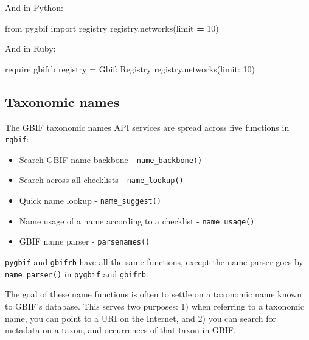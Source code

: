 \documentclass[3p]{elsarticle} %
\providecommand{\tightlist}{%
  \setlength{\itemsep}{0pt}\setlength{\parskip}{0pt}}
\newenvironment{Shaded}{\begin{snugshade}}{\end{snugshade}}
\newcommand{\DataTypeTok}[1]{\textcolor[rgb]{0.13,0.29,0.53}{#1}}
\newcommand{\DecValTok}[1]{\textcolor[rgb]{0.00,0.00,0.81}{#1}}
\newcommand{\ImportTok}[1]{#1}
\newcommand{\NormalTok}[1]{#1}
\newcommand{\OperatorTok}[1]{\textcolor[rgb]{0.81,0.36,0.00}{\textbf{#1}}}
\newcommand{\StringTok}[1]{\textcolor[rgb]{0.31,0.60,0.02}{#1}}
\begin{document}
And in Python:

\begin{Shaded}
\begin{Highlighting}[]
\ImportTok{from}\NormalTok{ pygbif }\ImportTok{import}\NormalTok{ registry}
\NormalTok{registry.networks(limit }\OperatorTok{=} \DecValTok{10}\NormalTok{)}
\end{Highlighting}
\end{Shaded}

And in Ruby:

\begin{Shaded}
\begin{Highlighting}[]
\NormalTok{require }\StringTok{\textquotesingle{}gbifrb\textquotesingle{}}
\NormalTok{registry = }\DataTypeTok{Gbif}\NormalTok{::}\DataTypeTok{Registry}
\NormalTok{registry.networks(}\StringTok{limit: }\DecValTok{10}\NormalTok{)}
\end{Highlighting}
\end{Shaded}

\hypertarget{taxonomic-names}{%
\subsection{Taxonomic names}\label{taxonomic-names}}

The GBIF taxonomic names API services are spread across five functions
in \texttt{rgbif}:

\begin{itemize}
\tightlist
\item
  Search GBIF name backbone - \texttt{name\_backbone()}
\item
  Search across all checklists - \texttt{name\_lookup()}
\item
  Quick name lookup - \texttt{name\_suggest()}
\item
  Name usage of a name according to a checklist - \texttt{name\_usage()}
\item
  GBIF name parser - \texttt{parsenames()}
\end{itemize}

\texttt{pygbif} and \texttt{gbifrb} have all the same functions, except
the name parser goes by \texttt{name\_parser()} in \texttt{pygbif} and
\texttt{gbifrb}.

The goal of these name functions is often to settle on a taxonomic name
known to GBIF's database. This serves two purposes: 1) when referring to
a taxonomic name, you can point to a URI on the Internet, and 2) you can
search for metadata on a taxon, and occurrences of that taxon in GBIF.
\end{document}
